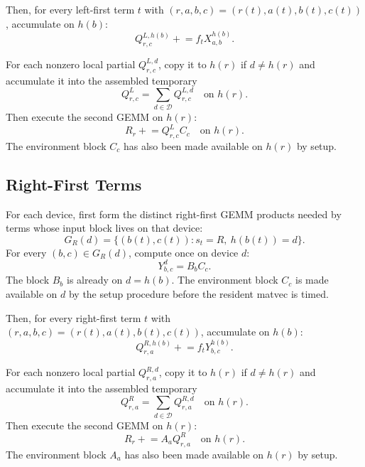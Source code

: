 \documentclass[11pt]{article}
\begin{document}
Then, for every left-first term $t$ with
$(r,a,b,c)=(r(t),a(t),b(t),c(t))$, accumulate on $h(b)$:
\begin{equation}
  Q^{L,h(b)}_{r,c}
  \mathrel{+}= f_t X^{h(b)}_{a,b}.
\end{equation}

For each nonzero local partial $Q^{L,d}_{r,c}$, copy it to $h(r)$ if
$d\ne h(r)$ and accumulate it into the assembled temporary
\begin{equation}
  Q^L_{r,c} = \sum_{d\in\mathcal{D}} Q^{L,d}_{r,c}
  \quad \text{on } h(r).
\end{equation}
Then execute the second GEMM on $h(r)$:
\begin{equation}
  R_r \mathrel{+}= Q^L_{r,c} C_c
  \quad \text{on } h(r).
\end{equation}
The environment block $C_c$ has also been made available on $h(r)$ by setup.

\subsection{Right-First Terms}

For each device, first form the distinct right-first GEMM products needed by
terms whose input block lives on that device:
\begin{equation}
  G_R(d) =
    \{(b(t),c(t)) : s_t=R,\ h(b(t))=d\}.
\end{equation}
For every $(b,c)\in G_R(d)$, compute once on device $d$:
\begin{equation}
  Y^d_{b,c} = B_b C_c .
\end{equation}
The block $B_b$ is already on $d=h(b)$.  The environment block $C_c$ is made
available on $d$ by the setup procedure before the resident matvec is timed.

Then, for every right-first term $t$ with
$(r,a,b,c)=(r(t),a(t),b(t),c(t))$, accumulate on $h(b)$:
\begin{equation}
  Q^{R,h(b)}_{r,a}
  \mathrel{+}= f_t Y^{h(b)}_{b,c}.
\end{equation}

For each nonzero local partial $Q^{R,d}_{r,a}$, copy it to $h(r)$ if
$d\ne h(r)$ and accumulate it into the assembled temporary
\begin{equation}
  Q^R_{r,a} = \sum_{d\in\mathcal{D}} Q^{R,d}_{r,a}
  \quad \text{on } h(r).
\end{equation}
Then execute the second GEMM on $h(r)$:
\begin{equation}
  R_r \mathrel{+}= A_a Q^R_{r,a}
  \quad \text{on } h(r).
\end{equation}
The environment block $A_a$ has also been made available on $h(r)$ by setup.
\end{document}
